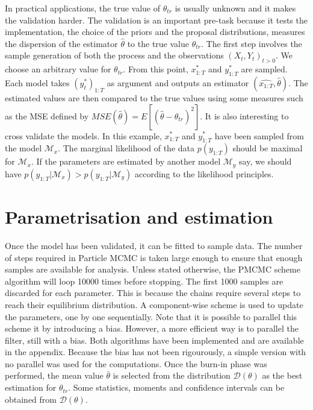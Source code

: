 \documentclass[11pt,a4,twosided,singlespacing,titlepagenumber=on]{scrreprt}
\numberwithin{equation}{chapter} %
\theoremstyle{remark}
\begin{document}
In practical applications, the true value of $\theta_{tr}$ is usually unknown and it makes the validation harder. The validation is an important pre-task because it tests the implementation, the choice of the priors and the proposal distributions, measures the dispersion of the estimator $\hat{\theta}$ to the true value $\theta_{tr}$. The first step involves the sample generation of both the process and the observations $(X_t, Y_t)_{t > 0}$. We choose an arbitrary value for $\theta_{tr}$. From this point, $x^*_{1:T}$ and $y^*_{1:T}$ are sampled. Each model takes $(y_t^*)_{1:T}$ as argument and outputs an estimator $(\hat{x_{1:T}}, \hat{\theta})$. The estimated values are then compared to the true values using some measures such as the MSE defined by $MSE(\hat{\theta}) = E[ ( \hat{\theta} - \theta_{tr} )^2 ]$. It is also interesting to cross validate the models. In this example, $x^*_{1:T}$ and $y^*_{1:T}$ have been sampled from the model $\mathcal{M}_x$. The marginal likelihood of the data $p(y_{1:T})$ should be maximal for $\mathcal{M}_x$. If the parameters are estimated by another model $\mathcal{M}_y$ say, we should have $p(y_{1:T} | \mathcal{M}_x) > p(y_{1:T} | \mathcal{M}_y)$ according to the likelihood principles.


\section{Parametrisation and estimation}

Once the model has been validated, it can be fitted to sample data. The number of steps required in Particle MCMC is taken large enough to ensure that enough samples are available for analysis. Unless stated otherwise, the PMCMC scheme algorithm will loop 10000 times before stopping. The first 1000 samples are discarded for each parameter. This is because the chains require several steps to reach their equilibrium distribution. A component-wise scheme is used to update the parameters, one by one sequentially. Note that it is possible to parallel this scheme it by introducing a bias. However, a more efficient way is to parallel the filter, still with a bias. Both algorithms have been implemented and are available in the appendix. Because the bias has not been rigourously, a simple version with no parallel was used for the computations. Once the burn-in phase was performed, the mean value $\bar{\theta}$ is selected from the distribution $\mathcal{D}(\theta)$ as the best estimation for $\theta_{tr}$. Some statistics, moments and confidence intervals can be obtained from $\mathcal{D}(\theta)$.
\end{document}
